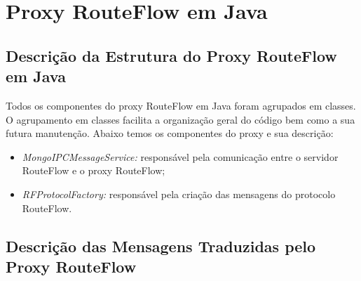 \chapter{Proxy RouteFlow em Java}

\section{Descrição da Estrutura do Proxy RouteFlow em Java}

Todos os componentes do proxy RouteFlow em Java foram agrupados em classes. O agrupamento em classes facilita a organização geral do código bem como a sua futura manutenção. Abaixo temos os componentes do proxy e sua descrição:

\begin{itemize}
\item \textit{MongoIPCMessageService:} responsável pela comunicação entre o servidor RouteFlow e o proxy RouteFlow;
\item \textit{RFProtocolFactory:} responsável pela criação das mensagens do protocolo RouteFlow.
\end{itemize} 

\section{Descrição das Mensagens Traduzidas pelo Proxy RouteFlow}

